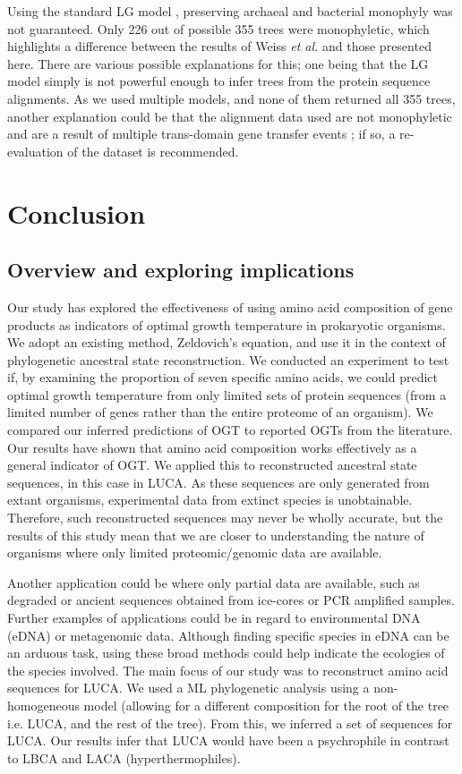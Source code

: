 Using the standard LG model \cite{le2008improved}, preserving archaeal and bacterial monophyly was not guaranteed. Only 226 out of possible 355 trees were monophyletic, which highlights a difference between the results of Weiss \textit{et al.} \cite{weiss2016} and those presented here. There are various possible explanations for this; one being that the LG model simply is not powerful enough to infer trees from the protein sequence alignments. As we used multiple models, and none of them returned all 355 trees, another explanation could be that the alignment data used are not monophyletic and are a result of multiple trans-domain gene transfer events \cite{gogarten2016luca}; if so, a re-evaluation of the dataset is recommended. 

\section{Conclusion}

\subsection{Overview and exploring implications}
Our study has explored the effectiveness of using amino acid composition of gene products as indicators of optimal growth temperature in prokaryotic organisms. We adopt an existing method, Zeldovich's equation, and use it in the context of phylogenetic ancestral state reconstruction. We conducted an experiment to test if, by examining the proportion of seven specific amino acids, we could predict optimal growth temperature from only limited sets of protein sequences (from a limited number of genes rather than the entire proteome of an organism). We compared our inferred predictions of OGT to reported OGTs from the literature. Our results have shown that amino acid composition works effectively as a general indicator of OGT. We applied this to reconstructed ancestral state sequences, in this case in LUCA. As these sequences are only generated from extant organisms, experimental data from extinct species is unobtainable. Therefore, such reconstructed sequences may never be wholly accurate, but the results of this study mean that we are closer to understanding the nature of organisms where only limited proteomic/genomic data are available.

Another application could be where only partial data are available, such as degraded or ancient sequences obtained from ice-cores or PCR amplified samples. Further examples of applications could be in regard to environmental DNA (eDNA) or metagenomic data. Although finding specific species in eDNA can be an arduous task, using these broad methods could help indicate the ecologies of the species involved.
The main focus of our study was to reconstruct amino acid sequences for LUCA. We used a ML phylogenetic analysis using a non-homogeneous model (allowing for a different composition for the root of the tree i.e. LUCA, and the rest of the tree). From this, we inferred a set of sequences for LUCA. Our results infer that LUCA would have been a psychrophile in contrast to LBCA and LACA (hyperthermophiles).

